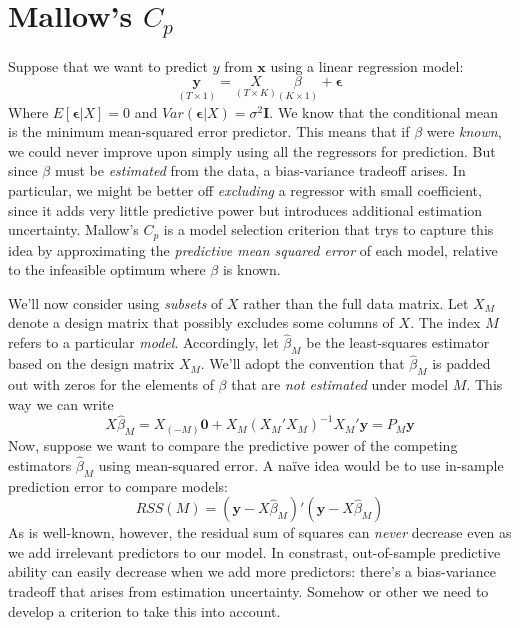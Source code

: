 \documentclass[12pt]{article}
\theoremstyle{definition}
\begin{document}
\section{Mallow's $C_p$}
Suppose that we want to predict $y$ from $\mathbf{x}$ using a linear regression model:
	$$\underset{(T\times1)}{\textbf{y}} = \underset{(T\times K)}{X} \underset{(K\times 1)}{\beta} + \boldsymbol{\epsilon}$$
Where $E[\boldsymbol{\epsilon}|X] = 0$ and $Var(\boldsymbol{\epsilon}|X) = \sigma^2 \mathbf{I}$. We know that the conditional mean is the minimum mean-squared error predictor. This means that if $\beta$ were \emph{known}, we could never improve upon simply using all the regressors for prediction. But since $\beta$ must be \emph{estimated} from the data, a bias-variance tradeoff arises. In particular, we might be better off \emph{excluding} a regressor with small coefficient, since it adds very little predictive power but introduces additional estimation uncertainty. Mallow's $C_p$ is a model selection criterion that trys to capture this idea by approximating the \emph{predictive mean squared error} of each model, relative to the infeasible optimum where $\beta$ is known.

We'll now consider using \emph{subsets} of $X$ rather than the full data matrix. Let $X_M$ denote a design matrix that possibly excludes some columns of $X$. The index $M$ refers to a particular \emph{model}. Accordingly, let $\widehat{\beta}_M$ be the least-squares estimator based on the design matrix $X_M$. We'll adopt the convention that $\widehat{\beta}_M$ is padded out with zeros for the elements of $\beta$ that are \emph{not estimated} under model $M$. This way we can write
	$$X\widehat{\beta}_M = X_{(-M)}\textbf{0} + X_M (X_M'X_M)^{-1} X_M'\textbf{y} = P_M \textbf{y}$$
Now, suppose we want to compare the predictive power of the competing estimators $\widehat{\beta}_M$ using mean-squared error. A na\"{i}ve idea would be to use in-sample prediction error to compare models:
	$$RSS(M) = (\textbf{y} - X\widehat{\beta}_M)'(\textbf{y} - X\widehat{\beta}_M)$$
As is well-known, however, the residual sum of squares can \emph{never} decrease even as we add irrelevant predictors to our model. In constrast, out-of-sample predictive ability can easily decrease when we add more predictors: there's a bias-variance tradeoff that arises from estimation uncertainty. Somehow or other we need to develop a criterion to take this into account.
\end{document}
